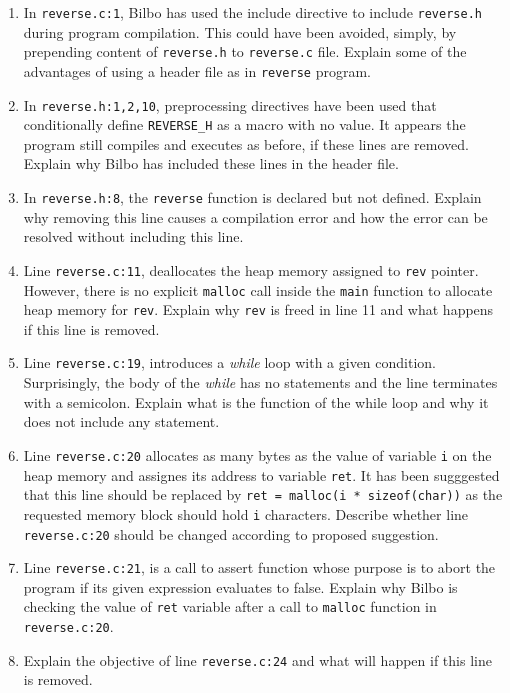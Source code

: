 \documentclass[12pt,letterpaper,twoside]{article}
\begin{document}
\begin{enumerate}
\item
In \texttt{reverse.c:1}, Bilbo has used the include directive to include \texttt{reverse.h} during program compilation.
This could have been avoided, simply, by prepending content of \texttt{reverse.h} to \texttt{reverse.c} file.
Explain some of the advantages of using a header file as in \texttt{reverse} program.

\item
In \texttt{reverse.h:1,2,10}, preprocessing directives have been used that conditionally define \texttt{REVERSE\_H} as a macro with no value.
It appears the program still compiles and executes as before, if these lines are removed.
Explain why Bilbo has included these lines in the header file.

\item
In \texttt{reverse.h:8}, the \texttt{reverse} function is declared but not defined.
Explain why removing this line causes a compilation error and how the error can be resolved without including this line.

\item
Line \texttt{reverse.c:11}, deallocates the heap memory assigned to \texttt{rev} pointer.
However, there is no explicit \texttt{malloc} call inside the \texttt{main} function to allocate heap memory for \texttt{rev}.
Explain why \texttt{rev} is freed in line 11 and what happens if this line is removed.

\item
Line \texttt{reverse.c:19}, introduces a \textit{while} loop with a given condition.
Surprisingly, the body of the \textit{while} has no statements and the line terminates with a semicolon.
Explain what is the function of the while loop and why it does not include any statement.

\item
Line \texttt{reverse.c:20} allocates as many bytes as the value of variable \texttt{i} on the heap memory and assignes its address to variable \texttt{ret}.
It has been sugggested that this line should be replaced by \texttt{ret = malloc(i * sizeof(char))} as the requested memory block should hold \texttt{i} characters.
Describe whether line \texttt{reverse.c:20} should be changed according to proposed suggestion.

\item
Line \texttt{reverse.c:21}, is a call to assert function whose purpose is to abort the program if its given expression evaluates to false.
Explain why Bilbo is checking the value of \texttt{ret} variable after a call to \texttt{malloc} function in \texttt{reverse.c:20}.

\item
Explain the objective of line \texttt{reverse.c:24} and what will happen if this line is removed.
\end{enumerate}
\end{document}
